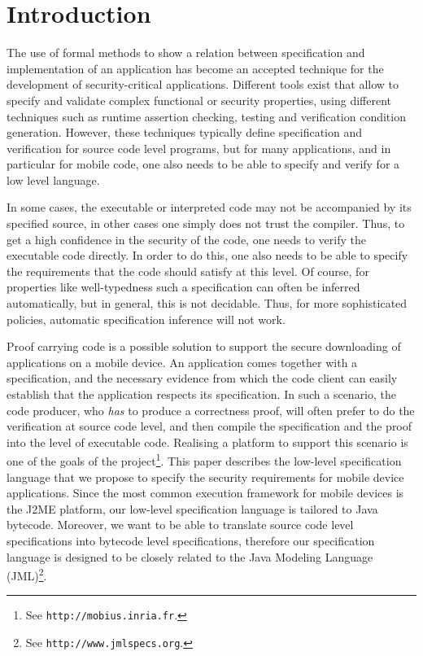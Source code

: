 \section{Introduction}\label{IntroSectLab}

The use of formal methods to show a relation between specification and
implementation of an application has become an accepted technique for
the development of security-critical applications. Different tools
exist that allow to specify and validate complex functional or
security properties, using different techniques such as runtime
assertion checking, testing and verification condition generation.
However, these techniques typically define specification and
verification for source code level programs, but for many
applications, and in particular for mobile code, one also needs to be
able to specify and verify for a low level language.


In some cases, the executable or interpreted code may not be
accompanied by its specified source, in other cases one simply does
not trust the compiler. Thus, to get a high confidence in the security
of the code, one needs to verify the executable code directly. In
order to do this, one also needs to be able to specify the
requirements that the code should satisfy at this level. Of course,
for properties like well-typedness such a specification can often be
inferred automatically, but in general, this is not decidable. Thus,
for more sophisticated policies, automatic specification inference
will not work.

Proof carrying code is a possible solution to support the secure
downloading of applications on a mobile device. An application comes
together with a specification, and the necessary evidence from which
the code client can easily establish that the application respects its
specification. In such a scenario, the code producer, who \emph{has}
to produce a correctness proof, will often prefer to do the
verification at source code level, and then compile the specification
and the proof into the level of executable code. Realising a platform
to support this scenario is one of the goals of the \mobius
project\footnote{See
\texttt{http://mobius.inria.fr}.}. This paper describes the
low-level specification language that we propose to specify the
security requirements for mobile device applications. Since the most
common execution framework for mobile devices is the J2ME platform,
our low-level specification language is tailored to Java
bytecode. Moreover, we want to be able to translate source code level
specifications into bytecode level specifications, therefore our
specification language is designed to be closely related to the Java
Modeling Language (JML)\footnote{See
\texttt{http://www.jmlspecs.org}.}.


